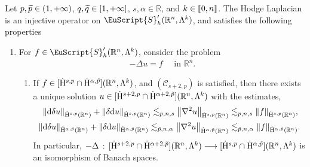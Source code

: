 \documentclass[AHL,Unicode,longabstracts,published]{cedram}
\newcommand{\bbR}{\mathbb{R}}
\newcommand{\rmH}{\mathrm{H}}%
\newcommand{\rmd}{\mathrm{d}}
\newcommand{\clC}{\mathcal{C}}
\newcommand{\eus}{\EuScript}
\newcommand{\llbracket}{\mathopen{[\mkern -2.7mu[}}
\newcommand{\rrbracket}{\mathclose{]\mkern -2.7mu]}}
\newcommand{\llb}{\llbracket}
\newcommand{\rrb}{\rrbracket}
\newcommand*{\romanenumi}{\renewcommand*{\theenumi}{\roman{enumi}}}
\let\oldtilde\tilde
\renewcommand*{\tilde}[1]{\mathchoice{\widetilde{#1}}{\widetilde{#1}}{\oldtilde{#1}}{\oldtilde{#1}}}
\begin{document}
\begin{theo}\label{thm:MetaThm1LaplacianRn}
Let $p,\Tilde{p}\in(1,+\infty)$, $q,\Tilde{q}\in[1,+\infty]$, $s,\alpha\in\bbR$, and $k\in\llb 0,n\rrb$. The Hodge Laplacian is an injective operator on $\eus{S}'_h(\bbR^n,\Lambda^k)$, and satisfies the following properties
\begin{enumerate}\romanenumi
\item\label{theo2.7.1} For $f\in \eus{S}'_h(\bbR^n,\Lambda^k)$, consider the problem
\begin{align*}
- \Delta u = f\quad\text{ in } \bbR^n.
\end{align*}
\begin{enumerate}
\item\label{theo2.7.1.a} If $f\in [\dot{\rmH}^{s,p}\cap \dot{\rmH}^{\alpha,\tilde{p}}](\bbR^n,\Lambda^k)$, and $(\clC_{s+2,p})$ is satisfied, then there exists a unique solution $u\in [\dot{\rmH}^{s+2,p}\cap \dot{\rmH}^{\alpha+2,\tilde{p}}](\bbR^n,\Lambda^k)$ with the estimates,
\begin{align*}
\| \rmd\delta u\|_{\dot{\rmH}^{s,p}(\bbR^n)} + \| \delta\rmd u\|_{\dot{\rmH}^{s,p}(\bbR^n)} \lesssim_{p,n,s} \left\| \nabla^2 u\right\|_{\dot{\rmH}^{s,p}(\bbR^n)} &\lesssim_{p,n,s} \| f\|_{\dot{\rmH}^{s,p}(\bbR^n)}\text{,}\\
\| \rmd\delta u\|_{\dot{\rmH}^{\alpha,\tilde{p}}(\bbR^n)} + \| \delta\rmd u\|_{\dot{\rmH}^{\alpha,\tilde{p}}(\bbR^n)} \lesssim_{\tilde{p},n,\alpha} \left\| \nabla^2 u\right\|_{\dot{\rmH}^{\alpha,\tilde{p}}(\bbR^n)} &\lesssim_{\tilde{p},n,\alpha} \| f\|_{\dot{\rmH}^{\alpha,\tilde{p}}(\bbR^n)} .
\end{align*}
In particular, $-\Delta\,:\,[\dot{\rmH}^{s+2,p}\cap \dot{\rmH}^{\alpha+2,\tilde{p}}](\bbR^n,\Lambda^k)\longrightarrow [\dot{\rmH}^{s,p}\cap \dot{\rmH}^{\alpha,\tilde{p}}](\bbR^n,\Lambda^k)$ is an isomorphism of Banach spaces.


\end{enumerate}
\end{enumerate}
\end{theo}
\end{document}
